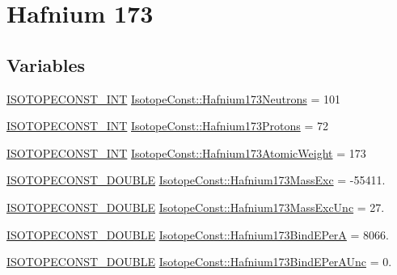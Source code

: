 \hypertarget{group___isotope_const-_hafnium-_hf173}{}\section{Hafnium 173}
\label{group___isotope_const-_hafnium-_hf173}
\subsection*{Variables}
\begin{DoxyCompactItemize}
\item 
\mbox{\hyperlink{group___isotope_const-_macros_ga5f18360b3e99483a35c32d789e62621c}{I\+S\+O\+T\+O\+P\+E\+C\+O\+N\+S\+T\+\_\+\+I\+NT}} \mbox{\hyperlink{group___isotope_const-_hafnium-_hf173_gaf298d0a465ba79ec18ea5632b349b0dc}{Isotope\+Const\+::\+Hafnium173\+Neutrons}} = 101
\item 
\mbox{\hyperlink{group___isotope_const-_macros_ga5f18360b3e99483a35c32d789e62621c}{I\+S\+O\+T\+O\+P\+E\+C\+O\+N\+S\+T\+\_\+\+I\+NT}} \mbox{\hyperlink{group___isotope_const-_hafnium-_hf173_ga02030f0f777e3665d709e06791560789}{Isotope\+Const\+::\+Hafnium173\+Protons}} = 72
\item 
\mbox{\hyperlink{group___isotope_const-_macros_ga5f18360b3e99483a35c32d789e62621c}{I\+S\+O\+T\+O\+P\+E\+C\+O\+N\+S\+T\+\_\+\+I\+NT}} \mbox{\hyperlink{group___isotope_const-_hafnium-_hf173_gae6463555f7645cae4f037df31b6eff72}{Isotope\+Const\+::\+Hafnium173\+Atomic\+Weight}} = 173
\item 
\mbox{\hyperlink{group___isotope_const-_macros_ga8f45a7272ce02c0b4c65c44636ed719a}{I\+S\+O\+T\+O\+P\+E\+C\+O\+N\+S\+T\+\_\+\+D\+O\+U\+B\+LE}} \mbox{\hyperlink{group___isotope_const-_hafnium-_hf173_gabb5885f7f69949d3a36cf7ebc288c887}{Isotope\+Const\+::\+Hafnium173\+Mass\+Exc}} = -\/55411.
\item 
\mbox{\hyperlink{group___isotope_const-_macros_ga8f45a7272ce02c0b4c65c44636ed719a}{I\+S\+O\+T\+O\+P\+E\+C\+O\+N\+S\+T\+\_\+\+D\+O\+U\+B\+LE}} \mbox{\hyperlink{group___isotope_const-_hafnium-_hf173_gaff8fb36eb357dd83990485451297b2e7}{Isotope\+Const\+::\+Hafnium173\+Mass\+Exc\+Unc}} = 27.
\item 
\mbox{\hyperlink{group___isotope_const-_macros_ga8f45a7272ce02c0b4c65c44636ed719a}{I\+S\+O\+T\+O\+P\+E\+C\+O\+N\+S\+T\+\_\+\+D\+O\+U\+B\+LE}} \mbox{\hyperlink{group___isotope_const-_hafnium-_hf173_gac6a8ecc07cc112589e83fde85743225f}{Isotope\+Const\+::\+Hafnium173\+Bind\+E\+PerA}} = 8066.
\item 
\mbox{\hyperlink{group___isotope_const-_macros_ga8f45a7272ce02c0b4c65c44636ed719a}{I\+S\+O\+T\+O\+P\+E\+C\+O\+N\+S\+T\+\_\+\+D\+O\+U\+B\+LE}} \mbox{\hyperlink{group___isotope_const-_hafnium-_hf173_gae6293ad16ce64429a7ebcf4ee518df8e}{Isotope\+Const\+::\+Hafnium173\+Bind\+E\+Per\+A\+Unc}} = 0.

\end{DoxyCompactItemize}
